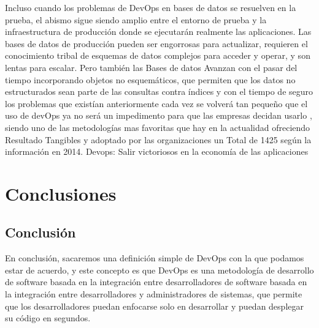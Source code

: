 \documentclass[preprint,12pt]{elsarticle}
\begin{document}
Incluso cuando los problemas de DevOps en bases de datos se resuelven en la prueba, el abismo sigue siendo amplio entre el entorno de prueba y la infraestructura de producción donde se ejecutarán realmente las aplicaciones. Las bases de datos de producción pueden ser engorrosas para actualizar, requieren el conocimiento tribal de esquemas de datos complejos para acceder y operar, y son lentas para escalar. Pero también las Bases de datos Avanzan con el pasar del tiempo incorporando objetos no esquemáticos, que permiten que los datos no estructurados sean parte de las consultas contra índices y con el tiempo de seguro los problemas que existían anteriormente cada vez se volverá tan pequeño que el uso de devOps ya no será un impedimento para que las empresas decidan usarlo , siendo uno de las metodologías mas favoritas que hay en la actualidad ofreciendo Resultado Tangibles y adoptado por las organizaciones un Total de 1425 según la información en 2014. Devops: Salir victoriosos en la economía de las aplicaciones




\section{Conclusiones}
\subsection{Conclusión }	
En conclusión, sacaremos una definición simple de DevOps con la que podamos estar de acuerdo, y este concepto es que DevOps es una metodología de desarrollo de software basada en la integración entre desarrolladores de software basada en la integración entre desarrolladores y administradores de sistemas, que permite que los desarrolladores puedan enfocarse solo en desarrollar y puedan desplegar su código en segundos.


	
	

	
	\newpage
	
		 
\citep{referenciarobles2}  
\citep{referenciarobles1}   
\citep{referenciaSandoval1} 
\citep{referenciaSandoval2}     

	
\end{document}
